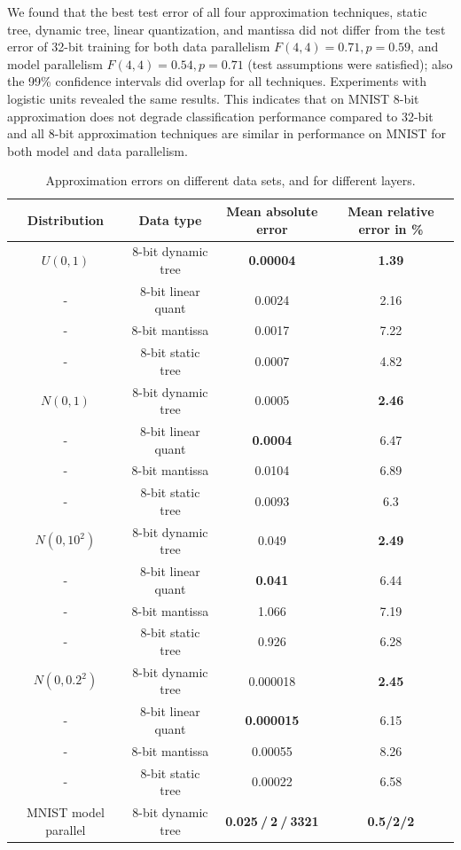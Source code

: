 \documentclass{article} %
\begin{document}
We found that the best test error of all four approximation techniques, static tree, dynamic tree, linear quantization, and mantissa  did not differ from the test error of 32-bit training for both data parallelism $F(4,4) = 0.71, p = 0.59$, and model parallelism $F(4,4) = 0.54, p = 0.71$ (test assumptions were satisfied); also the 99\% confidence intervals did overlap for all techniques. Experiments with logistic units revealed the same results. This indicates that on MNIST 8-bit approximation does not degrade classification performance compared to 32-bit and all 8-bit approximation techniques are similar in performance on MNIST for both model and data parallelism.


\begin{table}[h]
	\caption{Approximation errors on different data sets, and for different layers.}
	\label{sample-table}
\begin{minipage}
	{\linewidth}
	\centering
	\begin{tabular}{ cccc}
		\toprule[1.5pt]
		Distribution & Data type & Mean absolute error & Mean relative error in \%\\\midrule
		$U(0,1)$ & 8-bit dynamic tree & {\bf0.00004} & {\bf 1.39}  \\
		- & 8-bit linear quant & 0.0024 & 2.16\\
		- & 8-bit mantissa & 0.0017 & 7.22\\
		- & 8-bit static tree & 0.0007 & 4.82\\\midrule	
		$N(0,1)$ & 8-bit dynamic tree & 0.0005 & {\bf2.46}\\
	- & 8-bit linear quant &  {\bf0.0004} & 6.47 \\
	- & 8-bit mantissa & 0.0104 & 6.89 \\
	- & 8-bit static tree & 0.0093 & 6.3 \\\midrule
	$N(0,10^2)$ & 8-bit dynamic tree & 0.049 & {\bf2.49} \\
- & 8-bit linear quant & {\bf0.041 }& 6.44 \\
- & 8-bit mantissa & 1.066 & 7.19\\
- & 8-bit static tree & 0.926 & 6.28 \\\midrule
$N(0,0.2^2)$ & 8-bit dynamic tree & 0.000018 & {\bf2.45} \\
- & 8-bit linear quant &{\bf 0.000015} & 6.15 \\
- & 8-bit mantissa & 0.00055 & 8.26\\
- & 8-bit static tree & 0.00022 & 6.58 \\\midrule
MNIST model parallel & 8-bit dynamic tree & {\bf 0.025$\>$/$\>$2$\>$/$\>$3321 }& {\bf0.5/2/2} \\

\end{tabular}
\end{minipage}
\end{table}
\end{document}

